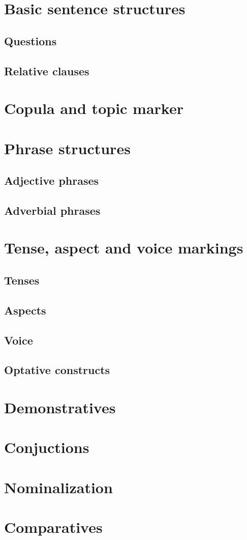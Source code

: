 \section{Basic sentence structures}
\subsection{Questions}
\subsection{Relative clauses}

\section{Copula and topic marker}

\section{Phrase structures}
\subsection{Adjective phrases}
\subsection{Adverbial phrases}

\section{Tense, aspect and voice markings}
\subsection{Tenses}
\subsection{Aspects}
\subsection{Voice}
\subsection{Optative constructs}

\section{Demonstratives}

\section{Conjuctions}

\section{Nominalization}

\section{Comparatives}